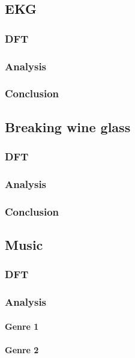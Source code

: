 \subsection{EKG}
\subsubsection{DFT}

\subsubsection{Analysis}

\subsubsection{Conclusion}

\subsection{Breaking wine glass}
\subsubsection{DFT}

\subsubsection{Analysis}

\subsubsection{Conclusion}

\subsection{Music}
\subsubsection{DFT}

\subsubsection{Analysis}

\paragraph{Genre 1}

\paragraph{Genre 2}

